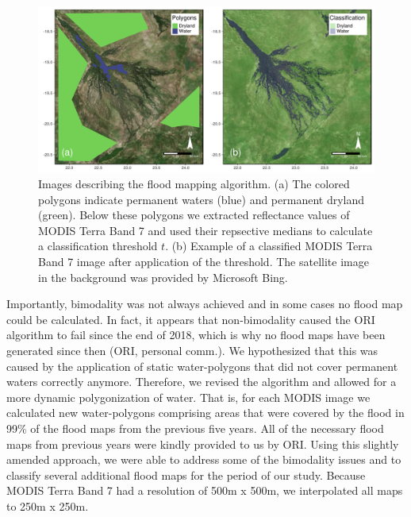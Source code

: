\documentclass[abstract=off,10pt,a4paper,bibliography=totocnumbered]{article}
\begin{document}
\begin{figure}[hbtp]
  \begin{center}
    \includegraphics[width = \textwidth]{99_Floodmapping.pdf}
    \caption{Images describing the flood mapping algorithm. (a) The colored
    polygons indicate permanent waters (blue) and permanent dryland (green).
    Below these polygons we extracted reflectance values of MODIS Terra Band 7
    and used their repsective medians to calculate a classification threshold
    \(t\). (b) Example of a classified MODIS Terra Band 7 image after
    application of the threshold. The satellite image in the background was
    provided by Microsoft Bing.}
    \label{Floodmapping}
  \end{center}
\end{figure}

\noindent Importantly, bimodality was not always achieved and in some cases no
flood map could be calculated. In fact, it appears that non-bimodality caused
the ORI algorithm to fail since the end of 2018, which is why no flood maps have
been generated since then (ORI, personal comm.). We hypothesized that this was
caused by the application of static water-polygons that did not cover permanent
waters correctly anymore. Therefore, we revised the algorithm and allowed for a
more dynamic polygonization of water. That is, for each MODIS image we
calculated new water-polygons comprising areas that were covered by the flood in
99\% of the flood maps from the previous five years. All of the necessary flood
maps from previous years were kindly provided to us by ORI. Using this slightly
amended approach, we were able to address some of the bimodality issues and to
classify several additional flood maps for the period of our study. Because
MODIS Terra Band 7 had a resolution of 500m x 500m, we interpolated all maps to
250m x 250m.
\end{document}
